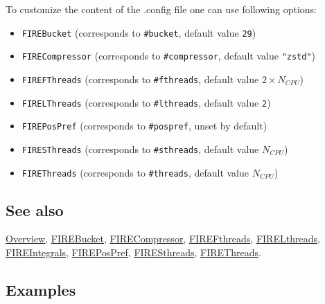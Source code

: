 \documentclass[../FeynHelpersManual.tex]{subfiles}
\begin{document}
To customize the content of the .config file one can use following
options:

\begin{itemize}
\tightlist
\item
  \texttt{FIREBucket} (corresponds to \texttt{\#{}\allowbreak{}bucket},
  default value \texttt{29})
\item
  \texttt{FIRECompressor} (corresponds to
  \texttt{\#{}\allowbreak{}compressor}, default value \texttt{"zstd"})
\item
  \texttt{FIREFThreads} (corresponds to
  \texttt{\#{}\allowbreak{}fthreads}, default value
  \(2 \times N_{CPU}\))
\item
  \texttt{FIRELThreads} (corresponds to
  \texttt{\#{}\allowbreak{}lthreads}, default value \texttt{2})
\item
  \texttt{FIREPosPref} (corresponds to
  \texttt{\#{}\allowbreak{}pospref}, unset by default)
\item
  \texttt{FIRESThreads} (corresponds to
  \texttt{\#{}\allowbreak{}sthreads}, default value \(N_{CPU}\))
\item
  \texttt{FIREThreads} (corresponds to
  \texttt{\#{}\allowbreak{}threads}, default value \(N_{CPU}\))
\end{itemize}

\subsection{See also}

\hyperlink{toc}{Overview}, \hyperlink{firebucket}{FIREBucket},
\hyperlink{firecompressor}{FIRECompressor},
\hyperlink{firefthreads}{FIREFthreads},
\hyperlink{firelthreads}{FIRELthreads},
\hyperlink{fireintegrals}{FIREIntegrals},
\hyperlink{firepospref}{FIREPosPref},
\hyperlink{firesthreads}{FIRESthreads},
\hyperlink{firethreads}{FIREThreads}.

\subsection{Examples}
\end{document}
